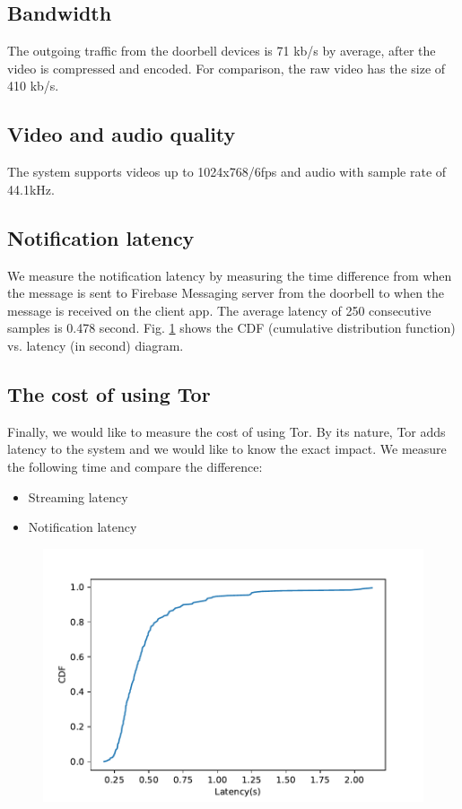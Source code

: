 \subsection{Bandwidth}
The outgoing traffic from the doorbell devices is 71 kb/s by average, after the video is compressed and encoded. For comparison, the raw video has the size of 410 kb/s.

\subsection{Video and audio quality}
The system supports videos up to 1024x768/6fps and audio with sample rate of 44.1kHz.

\subsection{Notification latency}
\label{subsec:notification_latency}
We measure the notification latency by measuring the time difference from when the message is sent to Firebase Messaging server from the doorbell to when the message is received on the client app. The average latency of 250 consecutive samples is 0.478 second. Fig. \ref{fig:notificationlatency_wTor} shows the CDF (cumulative distribution function) vs. latency (in second) diagram.

\subsection{The cost of using Tor}
Finally, we would like to measure the cost of using Tor. By its nature, Tor adds latency to the system and we would like to know the exact impact. We measure the following time and compare the difference:

\begin{itemize}
	\item Streaming latency
	\item Notification latency
\end{itemize}

\begin{figure}
	\includegraphics[width=\linewidth]{notification_latency_withTor.pdf}
	\caption{}
	\label{fig:notificationlatency_wTor}
\end{figure}

